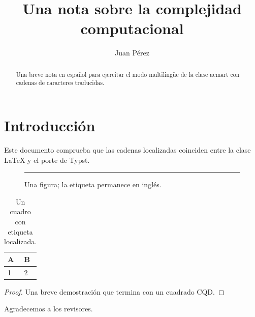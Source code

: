 \documentclass[acmsmall,language=spanish]{acmart}
\begin{document}
\title{Una nota sobre la complejidad computacional}

\author{Juan Pérez}

\renewcommand{\shortauthors}{Pérez}

\begin{abstract}
  Una breve nota en español para ejercitar el modo multilingüe de la clase acmart
  con cadenas de caracteres traducidas.
\end{abstract}


\maketitle

\section{Introducción}
Este documento comprueba que las cadenas localizadas coinciden entre la clase
LaTeX y el porte de Typst.

\begin{figure}[h]
\centering
\rule{4cm}{2cm}
\caption{Una figura; la etiqueta permanece en inglés.}
\end{figure}

\begin{table}[h]
\caption{Un cuadro con etiqueta localizada.}
\centering
\begin{tabular}{ll}
\toprule
A & B\\
\midrule
1 & 2\\
\bottomrule
\end{tabular}
\end{table}

\begin{proof}
Una breve demostración que termina con un cuadrado CQD.
\end{proof}

\begin{acks}
Agradecemos a los revisores.
\end{acks}
\end{document}
